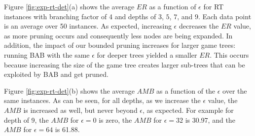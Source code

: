 \documentclass[runningheads]{llncs}
\newcommand{\amb}{\mathit{AMB}}
\newcommand{\er}{\mathit{ER}}
\begin{document}




Figure \ref{fig:exp-rt-det}(a) shows the average $\er$ as a function of $\epsilon$ for RT instances with branching factor of 4 and depths of $3$, $5$, $7$, and $9$.
Each data point is an average over 50 instances. 
As expected, increasing $\epsilon$ decreases the $\er$ value, as more pruning occurs and consequently less nodes are being expanded.
In addition, the impact of our bounded pruning increases for larger game trees: running BAB with the same $\epsilon$ for deeper trees yielded a smaller $\er$.
This occurs because increasing the size of the game tree creates larger sub-trees that can be exploited by BAB and get pruned. 

Figure \ref{fig:exp-rt-det}(b) shows the average $\amb$ as a function of the $\epsilon$ over the same instances. As can be seen, for all depths, as we increase the $\epsilon$ value, the $\amb$ is increased as well, but never beyond $\epsilon$, as expected. For example for depth of 9, the $\amb$ for $\epsilon=0$ is zero, the $\amb$ for $\epsilon=32$ is 30.97, and the $\amb$ for $\epsilon=64$ is 61.88. 
\end{document}
